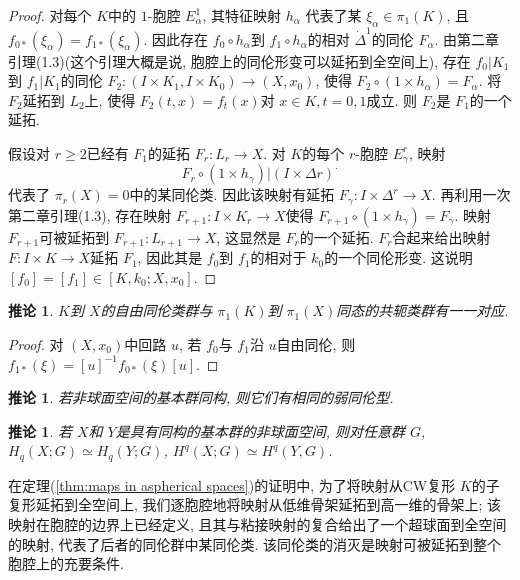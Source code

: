 \documentclass{ctexart}
\theoremstyle{plain}
\newtheorem{corollary}[theorem]{推论}
\theoremstyle{definition}
\begin{document}
\begin{proof}
            对每个 $K$中的 $1$-胞腔 $E_{\alpha}^{1}$, 其特征映射 $h_{\alpha}$ 代表了某 $\xi_{\alpha} \in \pi_1(K)$, 且 $f_{0*}(\xi_{\alpha})=f_{1*}(\xi_{\alpha})$. 因此存在 $f_0\circ h_{\alpha}$到 $f_1\circ h_{\alpha}$的相对 $\dot{\Delta}^{1}$的同伦 $F_{\alpha}$. 由\cite{Whitehead1978}第二章引理(1.3)(这个引理大概是说, 胞腔上的同伦形变可以延拓到全空间上), 存在 $f_0|K_1$到 $f_1|K_1$的同伦 $F_{2}:(I\times K_{1},I\times K_{0})\to (X,x_0)$, 使得 $F_{2}\circ (1\times h_{\alpha})=F_{\alpha}$. 将 $F_2$延拓到 $L_2$上, 使得 $F_2(t,x)=f_{t}(x)$对 $x\in K , t=0,1$成立. 则 $F_2$是 $F_1$的一个延拓.

            假设对 $r\ge 2$已经有 $F_1$的延拓 $F_{r}:L_{r}\to X$. 对 $K$的每个 $r$-胞腔 $E^{r}_{\gamma}$, 映射
            \begin{equation*}
                F_r \circ (1 \times h_{\gamma}) \big|{(I \times \Delta r)}^\cdot
            \end{equation*}
            代表了 $\pi_{r}(X)=0$中的某同伦类. 因此该映射有延拓 $F_{\gamma}:I\times \Delta^{r}\to X$. 再利用一次\cite{Whitehead1978}第二章引理(1.3), 存在映射 $F_{r+1}:I\times K_{r}\to X$使得 $F_{r+1}\circ(1\times h_{\gamma})=F_{\gamma}$. 映射 $F_{r+1}$可被延拓到 $F_{r+1}:L_{r+1}\to X$, 这显然是 $F_{r}$的一个延拓. $F_{r}$合起来给出映射 $F: I\times K\to X$延拓 $F_1$, 因此其是 $f_0$到 $f_1$的相对于 $k_0$的一个同伦形变. 这说明 $[f_0]=[f_1]\in [K,k_0; X,x_0]$.
        \end{proof}

        \begin{corollary}
            $K$到 $X$的自由同伦类群与 $\pi_1(K)$到 $\pi_1(X)$同态的共轭类群有一一对应.
        \end{corollary}

        \begin{proof}
            对 $(X,x_0)$中回路 $u$, 若 $f_0$与 $f_1$沿 $u$自由同伦, 则 $f_{1*}(\xi)=[u]^{-1}f_{0*}(\xi)[u]$.
        \end{proof}

        \begin{corollary}
            若非球面空间的基本群同构, 则它们有相同的弱同伦型.
        \end{corollary}

        \begin{corollary}
            若 $X$和 $Y$是具有同构的基本群的非球面空间, 则对任意群 $G$, $H_{q}(X;G)\simeq H_{q}(Y;G)$, $H^{q}(X;G)\simeq H^{q}(Y,G)$.
        \end{corollary}

        在定理(\ref{thm:maps in aspherical spaces})的证明中, 为了将映射从CW复形 $K$的子复形延拓到全空间上, 我们逐胞腔地将映射从低维骨架延拓到高一维的骨架上; 该映射在胞腔的边界上已经定义, 且其与粘接映射的复合给出了一个超球面到全空间的映射, 代表了后者的同伦群中某同伦类. 该同伦类的消灭是映射可被延拓到整个胞腔上的充要条件.
\end{document}
